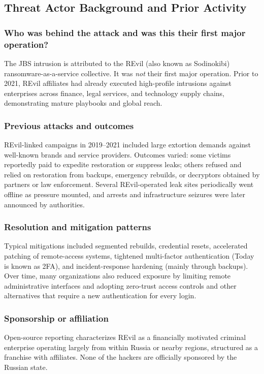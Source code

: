 \documentclass[conference]{IEEEtran}
\begin{document}
\subsection{Threat Actor Background and Prior Activity}
\subsubsection{Who was behind the attack and was this their first major operation?}\label{sec:who}
The JBS intrusion is attributed to the REvil (also known as Sodinokibi) ransomware-as-a-service collective. It was \textit{not} their first major operation. Prior to 2021, REvil affiliates had already executed high-profile intrusions against enterprises across finance, legal services, and technology supply chains, demonstrating mature playbooks and global reach.

\subsubsection{Previous attacks and outcomes}
REvil-linked campaigns in 2019--2021 included large extortion demands against well-known brands and service providers. Outcomes varied: some victims reportedly paid to expedite restoration or suppress leaks; others refused and relied on restoration from backups, emergency rebuilds, or decryptors obtained by partners or law enforcement. Several REvil-operated leak sites periodically went offline as pressure mounted, and arrests and infrastructure seizures were later announced by authorities.

\subsubsection{Resolution and mitigation patterns}
Typical mitigations included segmented rebuilds, credential resets, accelerated patching of remote-access systems, tightened multi-factor authentication (Today is known as 2FA), and incident-response hardening (mainly through backups). Over time, many organizations also reduced exposure by limiting remote administrative interfaces and adopting zero-trust access controls and other alternatives that require a new authentication for every login.

\subsubsection{Sponsorship or affiliation}
Open-source reporting characterizes REvil as a financially motivated criminal enterprise operating largely from within Russia or nearby regions, structured as a franchise with affiliates. None of the hackers are officially sponsored by the Russian state.
\end{document}
